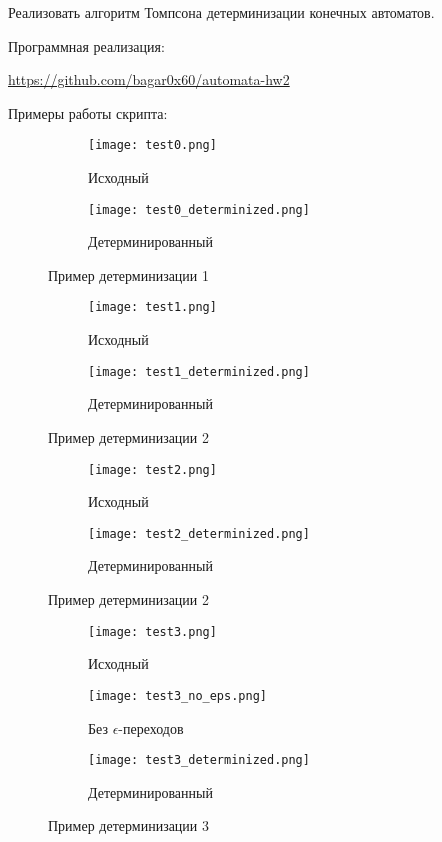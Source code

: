 \break

\begin{problem}
    Реализовать алгоритм Томпсона детерминизации конечных автоматов.
\end{problem}

Программная реализация:

\url{https://github.com/bagar0x60/automata-hw2}
\break

Примеры работы скрипта:

\begin{figure}[h]
    \centering
    \begin{subfigure}[b]{0.6\linewidth}
      \texttt{[image: test0.png]}
      \caption{Исходный}
    \end{subfigure}
    \begin{subfigure}[b]{0.6\linewidth}
      \texttt{[image: test0\_determinized.png]}
      \caption{Детерминированный}
    \end{subfigure}
    \caption{Пример детерминизации 1}
\end{figure}

\begin{figure}[h]
    \centering
    \begin{subfigure}[b]{0.4\linewidth}
      \texttt{[image: test1.png]}
      \caption{Исходный}
    \end{subfigure}
    \begin{subfigure}[b]{0.4\linewidth}
      \texttt{[image: test1\_determinized.png]}
      \caption{Детерминированный}
    \end{subfigure}
    \caption{Пример детерминизации 2}
\end{figure}

\begin{figure}[h]
    \centering
    \begin{subfigure}[b]{0.3\linewidth}
      \texttt{[image: test2.png]}
      \caption{Исходный}
    \end{subfigure}
    \begin{subfigure}[b]{0.6\linewidth}
      \texttt{[image: test2\_determinized.png]}
      \caption{Детерминированный}
    \end{subfigure}
    \caption{Пример детерминизации 2}
\end{figure}

\begin{figure}[h]
    \centering
    \begin{subfigure}[b]{0.4\linewidth}
      \texttt{[image: test3.png]}
      \caption{Исходный}
    \end{subfigure}
    \begin{subfigure}[b]{0.4\linewidth}
        \texttt{[image: test3\_no\_eps.png]}
        \caption{Без $\epsilon$-переходов}
    \end{subfigure}
    \begin{subfigure}[b]{0.6\linewidth}
      \texttt{[image: test3\_determinized.png]}
      \caption{Детерминированный}
    \end{subfigure}
    \caption{Пример детерминизации 3}
\end{figure}